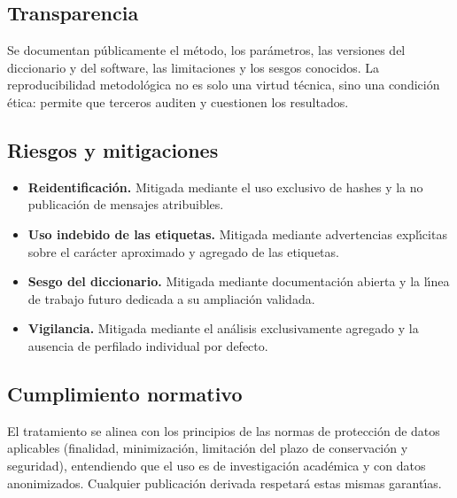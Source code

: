 \subsection{Transparencia}

Se documentan p\'ublicamente el m\'etodo, los par\'ametros, las versiones del diccionario
y del software, las limitaciones y los sesgos conocidos. La reproducibilidad
metodológica no es solo una virtud t\'ecnica, sino una
condici\'on \'etica: permite que terceros auditen y cuestionen los resultados.

\subsection{Riesgos y mitigaciones}

\begin{itemize}[leftmargin=1.4em]
  \item \textbf{Reidentificaci\'on.} Mitigada mediante el uso exclusivo de hashes y la
        no publicaci\'on de mensajes atribuibles.
  \item \textbf{Uso indebido de las etiquetas.} Mitigada mediante advertencias expl\'\i{}citas
        sobre el carácter aproximado y agregado de las etiquetas.
  \item \textbf{Sesgo del diccionario.} Mitigada mediante documentaci\'on abierta y la
        l\'\i{}nea de trabajo futuro dedicada a su ampliaci\'on validada.
  \item \textbf{Vigilancia.} Mitigada mediante el an\'alisis exclusivamente agregado y la
        ausencia de perfilado individual por defecto.
\end{itemize}

\subsection{Cumplimiento normativo}

El tratamiento se alinea con los principios de las normas de protecci\'on de datos
aplicables (finalidad, minimizaci\'on, limitaci\'on del plazo de conservaci\'on y
seguridad), entendiendo que el uso es de investigaci\'on acad\'emica y con datos
anonimizados. Cualquier publicaci\'on derivada respetar\'a estas mismas garant\'\i{}as.
